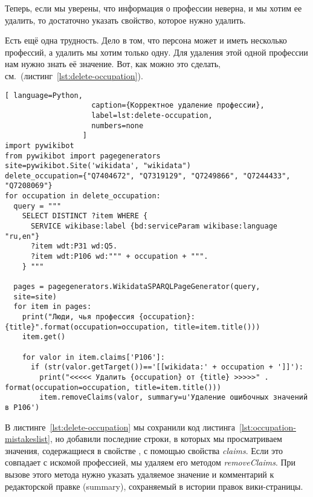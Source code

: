 Теперь, если мы уверены, что информация о профессии неверна, и мы хотим ее удалить, то достаточно указать свойство, которое нужно удалить.

Есть ещё одна трудность. Дело в том, что персона может и иметь несколько профессий, а удалить мы хотим только одну. 
Для удаления этой одной профессии нам нужно знать её значение. 
Вот, как можно это сделать, см.~(листинг~\ref{lst:delete-occupation}). 

\begin{fullwidth}
\begin{lstlisting}[ language=Python,
                    caption={Корректное удаление профессии},
                    label=lst:delete-occupation, 
                    numbers=none
                  ]
import pywikibot
from pywikibot import pagegenerators
site=pywikibot.Site('wikidata', "wikidata")
delete_occupation={"Q7404672", "Q7319129", "Q7249866", "Q7244433", 
"Q7208069"}
for occupation in delete_occupation:
  query = """
    SELECT DISTINCT ?item WHERE {
      SERVICE wikibase:label {bd:serviceParam wikibase:language "ru,en"}
      ?item wdt:P31 wd:Q5.
      ?item wdt:P106 wd:""" + occupation + """.
    } """

  pages = pagegenerators.WikidataSPARQLPageGenerator(query, 
  site=site)
  for item in pages:
    print("Люди, чья профессия {occupation}: {title}".format(occupation=occupation, title=item.title()))
    item.get()

    for valor in item.claims['P106']:
      if (str(valor.getTarget())=='[[wikidata:' + occupation + ']]'):
        print("<<<<< Удалить {occupation} от {title} >>>>>" . format(occupation=occupation, title=item.title()))
        item.removeClaims(valor, summary=u'Удаление ошибочных значений в P106')
\end{lstlisting} 
\end{fullwidth}

В листинге~\ref{lst:delete-occupation} мы сохранили код листинга~\ref{lst:occupation-mistakeslist}, но добавили последние строки, в которых мы просматриваем значения, содержащиеся в свойстве , с помощью свойства \textit{claims}. Если это совпадает с искомой профессией, мы удаляем его методом \textit{removeClaims}. При вызове этого метода нужно указать удаляемое значение и комментарий к редакторской правке (summary), сохраняемый в истории правок вики-страницы.

